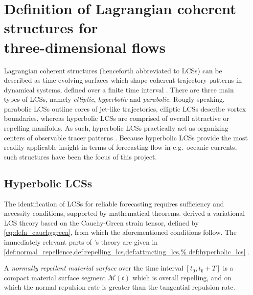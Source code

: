 \section[Definition of Lagrangian coherent structures for three-dimensional
flows]{Definition of Lagrangian coherent structures for\\\phantom{2.2}
three-dimensional flows}

Lagrangian coherent structures (henceforth abbreviated to LCSs) can be described
as time-evolving surfaces which shape coherent trajectory patterns in dynamical
systems, defined over a finite time interval \parencite{haller2010variational}.
There are three main types of LCSs, namely \emph{elliptic}, \emph{hyperbolic}
and \emph{parabolic}. Rougly speaking, parabolic LCSs outline cores of jet-like
trajectories, elliptic LCSs describe vortex boundaries, whereas hyperbolic LCSs
are comprised of overall attractive or repelling manifolds. As such, hyperbolic
LCSs practically act as organizing centers of observable tracer patterns
\parencite{onu2015lcstool}. Because hyperbolic LCSs provide the most readily
applicable insight in terms of forecasting flow in e.g.\ oceanic currents,
such structures have been the focus of this project.

\subsection{Hyperbolic LCSs}
\label{sub:hyperbolic_lcss}

The identification of LCSs for reliable forecasting requires sufficiency and
necessity conditions, supported by mathematical theorems.
\textcite{haller2010variational} derived a variational LCS theory based on
the Cauchy-Green strain tensor, defined by \cref{eq:defn_cauchygreen}, from
which the aforementioned conditions follow. The immediately relevant parts
of \citeauthor{haller2010variational}'s theory are given in
\cref{def:normal_repellence,def:repelling_lcs,def:attracting_lcs,%
def:hyperbolic_lcs} \parencite{haller2010variational}.

\begin{defn}
    \label{def:normal_repellence}
    A \emph{normally repellent material surface} over the time interval
    $[t_{0},t_{0}+T]$ is a compact material surface segment $\mathcal{M}(t)$
    which is overall repelling, and on which the normal repulsion rate is
    greater than the tangential repulsion rate.
\end{defn}

